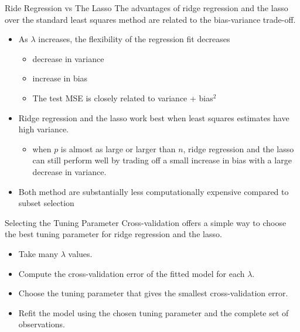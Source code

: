 \documentclass[
  ignorenonframetext,
  aspectratio=169,
]{beamer}
\providecommand{\tightlist}{%
  \setlength{\itemsep}{0pt}\setlength{\parskip}{0pt}}\usepackage{longtable,booktabs,array}
\begin{document}
\begin{frame}{Ride Regression vs The Lasso}
\protect\hypertarget{ride-regression-vs-the-lasso}{}
The advantages of ridge regression and the lasso over the standard least
squares method are related to the bias-variance trade-off.

\begin{itemize}
\item
  As \(\lambda\) increases, the flexibility of the regression fit
  decreases

  \begin{itemize}
  \item
    decrease in variance
  \item
    increase in bias
  \item
    The test MSE is closely related to variance + bias\(^2\)
  \end{itemize}
\item
  Ridge regression and the lasso work best when least squares estimates
  have high variance.

  \begin{itemize}
  \tightlist
  \item
    when \(p\) is almost as large or larger than \(n\), ridge regression
    and the lasso can still perform well by trading off a small increase
    in bias with a large decrease in variance.
  \end{itemize}
\item
  Both method are substantially less computationally expensive compared
  to subset selection
\end{itemize}
\end{frame}

\begin{frame}{Selecting the Tuning Parameter}
\protect\hypertarget{selecting-the-tuning-parameter}{}
Cross-validation offers a simple way to choose the best tuning parameter
for ridge regression and the lasso.

\begin{itemize}
\item
  Take many \(\lambda\) values.
\item
  Compute the cross-validation error of the fitted model for each
  \(\lambda\).
\item
  Choose the tuning parameter that gives the smallest cross-validation
  error.
\item
  Refit the model using the chosen tuning parameter and the complete set
  of observations.
\end{itemize}
\end{frame}
\end{document}
